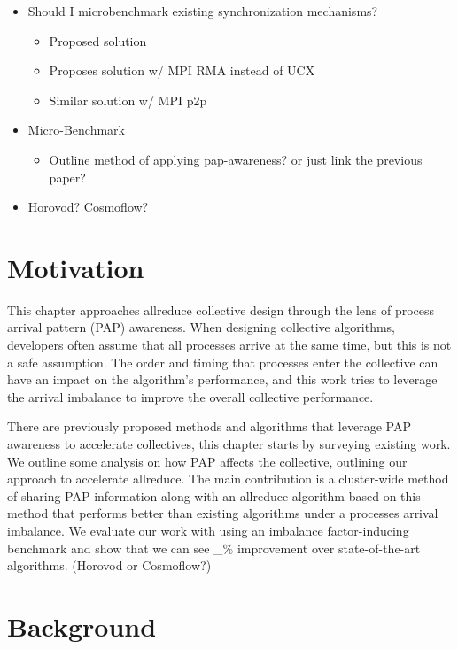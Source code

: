 \begin{itemize}
\begin{itemize}
        \item Should I microbenchmark existing synchronization mechanisms?
        \begin{itemize}
            \item Proposed solution
            \item Proposes solution w/ MPI RMA instead of UCX
            \item Similar solution w/ MPI p2p \cite{Parsons2015ExpProcImbMPICollHierarcialSys, Patarasuk2008EffBcastDifProcArr}
        \end{itemize}
        \item Micro-Benchmark
            \begin{itemize}
                \item Outline method of applying pap-awareness? or just link the previous paper?
            \end{itemize}
        \item Horovod? Cosmoflow?
    \end{itemize}
\end{itemize}

\section{Motivation}

This chapter approaches allreduce collective design through the lens of process arrival pattern (PAP) awareness. 
When designing collective algorithms, developers often assume that all processes arrive at the same time, but this is not a safe assumption.
The order and timing that processes enter the collective can have an impact on the algorithm's performance, and this work tries to leverage the arrival imbalance to improve the overall collective performance.

There are previously proposed methods and algorithms that leverage PAP awareness to accelerate collectives, this chapter starts by surveying existing work.
We outline some analysis on how PAP affects the collective, outlining our approach to accelerate allreduce.
The main contribution is a cluster-wide method of sharing PAP information along with an allreduce algorithm based on this method that performs better than existing algorithms under a processes arrival imbalance.
We evaluate our work with using an imbalance factor-inducing benchmark and show that we can see \_\% improvement over state-of-the-art algorithms.  
(Horovod or Cosmoflow?)

\section{Background}

